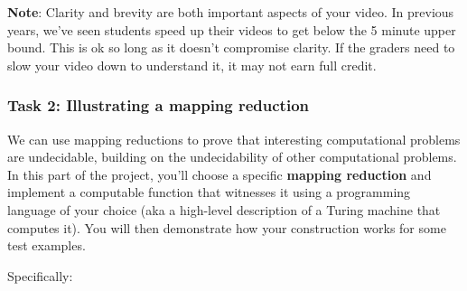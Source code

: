 \documentclass[12pt, oneside]{article}
\begin{document}
{\bf Note}: Clarity and brevity are both important aspects of your video.  In previous years, we've seen 
students speed up their videos to get below the 5 minute upper bound. This is ok so long as it doesn't 
compromise clarity. If the graders need to slow your video down to understand
it, it may not earn full credit.


\newpage
\subsubsection*{Task 2: Illustrating a mapping reduction}

We can use mapping reductions to prove that interesting computational 
problems are undecidable, building on 
the undecidability of other computational problems.
In this part of the project, you'll choose a specific {\bf mapping reduction}
and implement a computable function that witnesses it
using a  programming language of your choice (aka a high-level description of a Turing machine that computes it).
You will then demonstrate  how your construction works for some test examples.

Specifically:

\vspace{-10pt}
\end{document}
